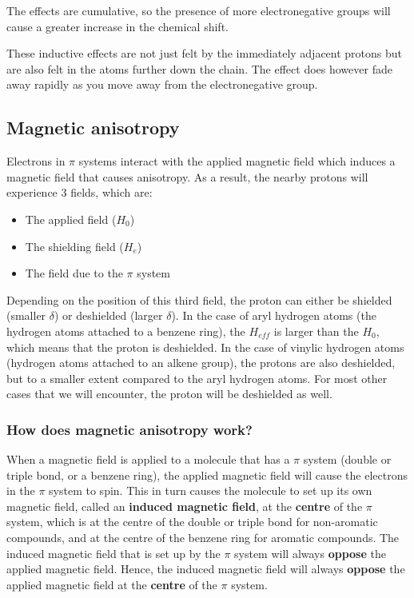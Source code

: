 \documentclass[11pt]{article}
\begin{document}
The effects are cumulative, so the presence of more electronegative groups will cause a greater increase in the chemical shift.

These inductive effects are not just felt by the immediately adjacent protons but are also felt in the atoms further down the chain. The effect does however fade away rapidly as you move away from the electronegative group.

\newpage
\subsection{Magnetic anisotropy}
\label{sec:orgfc2bf6f}
Electrons in \(\pi\) systems interact with the applied magnetic field which induces a magnetic field that causes anisotropy. As a result, the nearby protons will experience 3 fields, which are:
\begin{itemize}
\item The applied field (\(H_0\))
\item The shielding field (\(H_e\))
\item The field due to the \(\pi\) system
\end{itemize}

Depending on the position of this third field, the proton can either be shielded (smaller \(\delta\)) or deshielded (larger \(\delta\)). In the case of aryl hydrogen atoms (the hydrogen atoms attached to a benzene ring), the \(H_{eff}\) is larger than the \(H_0\), which means that the proton is deshielded. In the case of vinylic hydrogen atoms (hydrogen atoms attached to an alkene group), the protons are also deshielded, but to a smaller extent compared to the aryl hydrogen atoms. For most other cases that we will encounter, the proton will be deshielded as well.

\newpage
\subsubsection{How does magnetic anisotropy work?}
\label{sec:orgcccae53}
When a magnetic field is applied to a molecule that has a \(\pi\) system (double or triple bond, or a benzene ring), the applied magnetic field will cause the electrons in the \(\pi\) system to spin. This in turn causes the molecule to set up its own magnetic field, called an \textbf{induced magnetic field}, at the \textbf{centre} of the \(\pi\) system, which is at the centre of the double or triple bond for non-aromatic compounds, and at the centre of the benzene ring for aromatic compounds. The induced magnetic field that is set up by the \(\pi\) system will always \textbf{oppose} the applied magnetic field. Hence, the induced magnetic field will always \textbf{oppose} the applied magnetic field at the \textbf{centre} of the \(\pi\) system.
\end{document}
